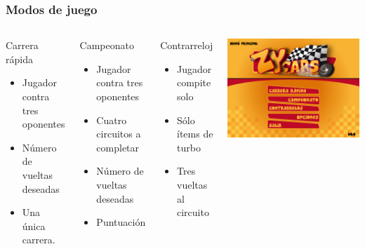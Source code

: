 \begin{frame}
    \frametitle{Modos de juego}

    \begin{columns}

        \column{170px}

        \begin{block}{Carrera rápida}
            \begin{itemize}
                \item Jugador contra tres oponentes
                \item Número de vueltas deseadas
                \item Una única carrera.
            \end{itemize}
        \end{block}

        \begin{block}{Campeonato}
            \begin{itemize}
                \item Jugador contra tres oponentes
                \item Cuatro circuitos a completar
                \item Número de vueltas deseadas
                \item Puntuación
            \end{itemize}
        \end{block}

        \begin{block}{Contrarreloj}
            \begin{itemize}
                \item Jugador compite solo
                \item Sólo ítems de turbo
                \item Tres vueltas al circuito
            \end{itemize}
        \end{block}

        \column{130px}
        
        \begin{center}
                \includegraphics[scale=0.17]{imagenes/menuprincipal.png}
        \end{center}


\end{columns}
\end{frame}
